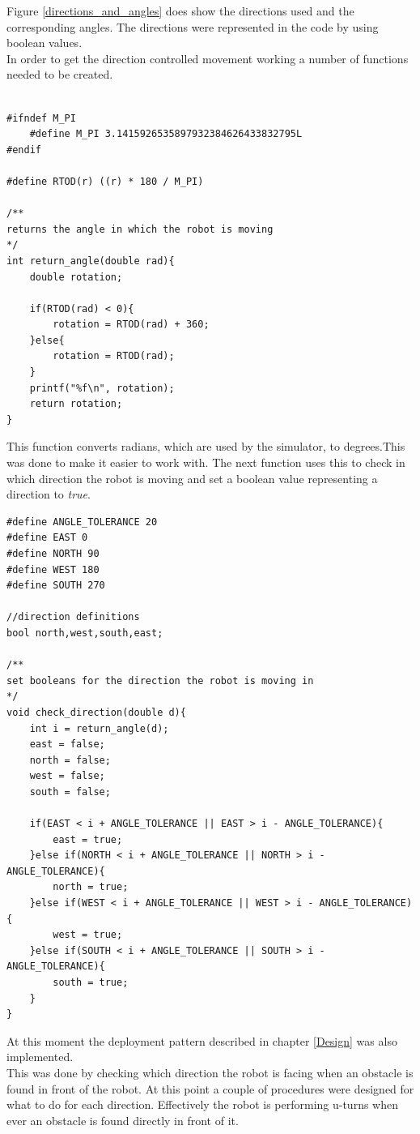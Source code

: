 Figure \ref{directions_and_angles} does show the directions used and the corresponding angles. The directions were represented in the code by using boolean values. \\
In order to get the direction controlled movement working a number of functions needed to be created.  

\begin{lstlisting}[caption={Converting Radians to degrees}]

#ifndef M_PI
	#define M_PI 3.1415926535897932384626433832795L
#endif

#define RTOD(r) ((r) * 180 / M_PI)

/**
returns the angle in which the robot is moving
*/
int return_angle(double rad){
	double rotation;

	if(RTOD(rad) < 0){
		rotation = RTOD(rad) + 360;
	}else{
		rotation = RTOD(rad);
	}
	printf("%f\n", rotation);
	return rotation;
}
\end{lstlisting}

This function converts radians, which are used by the simulator, to degrees.This was done to make it easier to work with.
The next function uses this to check in which direction the robot is moving and set a boolean value representing a direction to \textit{true}.

\begin{lstlisting}[caption={Early check of the movement direction}]
#define ANGLE_TOLERANCE 20
#define EAST 0
#define NORTH 90
#define WEST 180
#define SOUTH 270

//direction definitions
bool north,west,south,east;

/**
set booleans for the direction the robot is moving in
*/
void check_direction(double d){
	int i = return_angle(d);
	east = false;
	north = false;
	west = false;
	south = false;

	if(EAST < i + ANGLE_TOLERANCE || EAST > i - ANGLE_TOLERANCE){
		east = true;
	}else if(NORTH < i + ANGLE_TOLERANCE || NORTH > i - ANGLE_TOLERANCE){
		north = true;
	}else if(WEST < i + ANGLE_TOLERANCE || WEST > i - ANGLE_TOLERANCE){
		west = true;
	}else if(SOUTH < i + ANGLE_TOLERANCE || SOUTH > i - ANGLE_TOLERANCE){
		south = true;
	}
}
\end{lstlisting}

At this moment the deployment pattern described in chapter \ref{Design}  was also implemented. \\
This was done by checking which direction the robot is facing when an obstacle is found in front of the robot. At this point a couple of procedures were designed for what to do for each direction. Effectively the robot is performing u-turns when ever an obstacle is found directly in front of it. 

